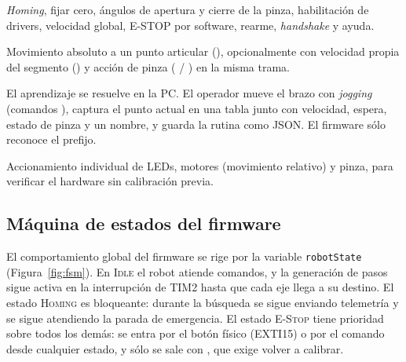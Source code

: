 \begin{description}[leftmargin=1.2cm, style=nextline]
  \item[\cmd{:-} Calibración / configuración] \emph{Homing}, fijar cero, ángulos de apertura y
        cierre de la pinza, habilitación de drivers, velocidad global, E-STOP por software,
        rearme, \emph{handshake} y ayuda.
  \item[\cmd{:\#} Ejecución] Movimiento absoluto a un punto articular
        (), opcionalmente con velocidad propia del segmento
        () y acción de pinza ( / ) en la misma trama.
  \item[\cmd{:+} Aprendizaje] El aprendizaje se resuelve en la PC. El operador mueve el brazo
        con \emph{jogging} (comandos \cmd{:\#}), captura el punto actual en una tabla junto con
        velocidad, espera, estado de pinza y un nombre, y guarda la rutina como JSON. El
        firmware sólo reconoce el prefijo.
  \item[\cmd{:*} Test / diagnóstico] Accionamiento individual de LEDs, motores (movimiento
        relativo) y pinza, para verificar el hardware sin calibración previa.
\end{description}

\subsection{Máquina de estados del firmware}
El comportamiento global del firmware se rige por la variable \texttt{robotState}
(Figura~\ref{fig:fsm}). En \textsc{Idle} el robot atiende comandos, y la generación de pasos
sigue activa en la interrupción de TIM2 hasta que cada eje llega a su destino. El estado
\textsc{Homing} es bloqueante: durante la búsqueda se sigue enviando telemetría y se sigue
atendiendo la parada de emergencia. El estado \textsc{E-Stop} tiene prioridad sobre todos
los demás: se entra por el botón físico (EXTI15) o por el comando  desde cualquier
estado, y sólo se sale con , que exige volver a calibrar.


